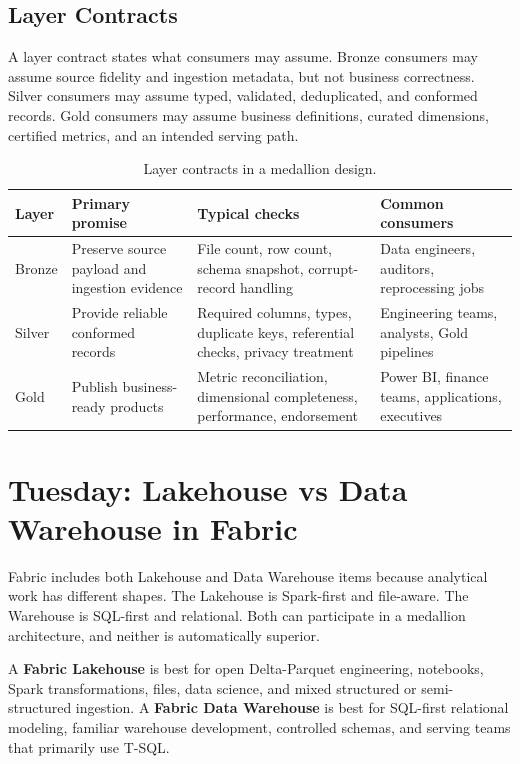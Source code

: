 \subsection{Layer Contracts}
A layer contract states what consumers may assume. Bronze consumers may assume source fidelity and ingestion metadata, but not business correctness. Silver consumers may assume typed, validated, deduplicated, and conformed records. Gold consumers may assume business definitions, curated dimensions, certified metrics, and an intended serving path.

\begin{table}[H]
\centering
\small
\begin{tabular}{@{}p{2.4cm}p{4.0cm}p{4.2cm}p{3.4cm}@{}}
\toprule
\textbf{Layer} & \textbf{Primary promise} & \textbf{Typical checks} & \textbf{Common consumers} \\
\midrule
Bronze & Preserve source payload and ingestion evidence & File count, row count, schema snapshot, corrupt-record handling & Data engineers, auditors, reprocessing jobs \\
Silver & Provide reliable conformed records & Required columns, types, duplicate keys, referential checks, privacy treatment & Engineering teams, analysts, Gold pipelines \\
Gold & Publish business-ready products & Metric reconciliation, dimensional completeness, performance, endorsement & Power BI, finance teams, applications, executives \\
\bottomrule
\end{tabular}
\caption{Layer contracts in a medallion design.}
\label{tab:chapter2-layer-contracts}
\end{table}

\section{Tuesday: Lakehouse vs Data Warehouse in Fabric}
Fabric includes both Lakehouse and Data Warehouse items because analytical work has different shapes. The Lakehouse is Spark-first and file-aware. The Warehouse is SQL-first and relational. Both can participate in a medallion architecture, and neither is automatically superior.

\begin{definitionbox}
A \textbf{Fabric Lakehouse} is best for open Delta-Parquet engineering, notebooks, Spark transformations, files, data science, and mixed structured or semi-structured ingestion. A \textbf{Fabric Data Warehouse} is best for SQL-first relational modeling, familiar warehouse development, controlled schemas, and serving teams that primarily use T-SQL.
\end{definitionbox}

